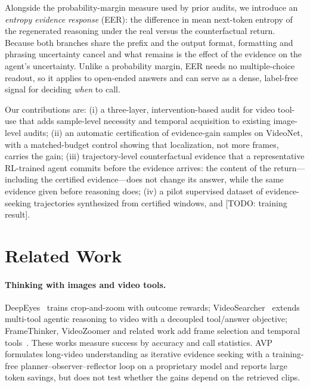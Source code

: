 \documentclass{article}
\newcommand{\todo}[1]{{\color{red}[TODO: #1]}}
\begin{document}
Alongside the probability-margin measure used by prior audits, we introduce an \emph{entropy evidence response} (EER): the difference in mean next-token entropy of the regenerated reasoning under the real versus the counterfactual return. Because both branches share the prefix and the output format, formatting and phrasing uncertainty cancel and what remains is the effect of the evidence on the agent's uncertainty. Unlike a probability margin, EER needs no multiple-choice readout, so it applies to open-ended answers and can serve as a dense, label-free signal for deciding \emph{when} to call.

Our contributions are: (i) a three-layer, intervention-based audit for video tool-use that adds sample-level necessity and temporal acquisition to existing image-level audits; (ii) an automatic certification of evidence-gain samples on VideoNet, with a matched-budget control showing that localization, not more frames, carries the gain; (iii) trajectory-level counterfactual evidence that a representative RL-trained agent commits before the evidence arrives: the content of the return---including the certified evidence---does not change its answer, while the same evidence given before reasoning does; (iv) a pilot supervised dataset of evidence-seeking trajectories synthesized from certified windows, and \todo{training result}.

\section{Related Work}
\label{sec:related}

\paragraph{Thinking with images and video tools.} DeepEyes~\citep{deepeyes2025} trains crop-and-zoom with outcome rewards; VideoSearcher~\citep{videosearcher2026} extends multi-tool agentic reasoning to video with a decoupled tool/answer objective; FrameThinker, VideoZoomer and related work add frame selection and temporal tools~\citep{framethinker2025,videozoomer2025}. These works measure success by accuracy and call statistics. AVP~\citep{avp2025} formulates long-video understanding as iterative evidence seeking with a training-free planner--observer--reflector loop on a proprietary model and reports large token savings, but does not test whether the gains depend on the retrieved clips.
\end{document}
